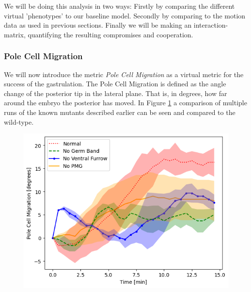 We will be doing this analysis in two ways: Firstly by comparing the different virtual 'phenotypes' to our baseline model. Secondly by comparing to the motion data as used in previous sections. Finally we will be making an interaction-matrix, quantifying the resulting compromises and cooperation.  

\subsubsection{Pole Cell Migration}

We will now introduce the metric \textit{Pole Cell Migration} as a virtual metric for the success of the gastrulation. The Pole Cell Migration is defined as the angle change of the posterior tip in the lateral plane. That is, in degrees, how far around the embryo the posterior has moved. In Figure \ref{fig:PCM-mutants} a comparison of multiple runs of the known mutants described earlier can be seen and compared to the wild-type.

\begin{figure}[H]
    \centering
    \includegraphics[width=1.\linewidth]{chapters/Results/figures/compare_PCM.png}
    \caption{}
    \label{fig:PCM-mutants}
\end{figure}


